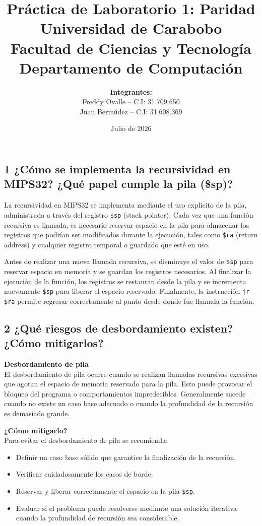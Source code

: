 \documentclass[12pt,a4paper]{article}
\title{
    \textbf{Práctica de Laboratorio 1: Paridad}\\
    \large Universidad de Carabobo \\
    Facultad de Ciencias y Tecnología \\
    Departamento de Computación
}
\author{
    \textbf{Integrantes:}\\
    Freddy Ovalle -- C.I: 31.709.650 \\
    Juan Bermúdez -- C.I: 31.608.369
}
\date{Julio de 2026}
\begin{document}
\maketitle


\subsection*{1 ¿Cómo se implementa la recursividad en MIPS32? ¿Qué papel cumple la pila (\$sp)?}
La recursividad en MIPS32 se implementa mediante el uso explícito de la pila, administrada a través del registro \texttt{\$sp} (stack pointer). Cada vez que una función recursiva es llamada, es necesario reservar espacio en la pila para almacenar los registros que podrían ser modificados durante la ejecución, tales como \texttt{\$ra} (return address) y cualquier registro temporal o guardado que esté en uso. 

Antes de realizar una nueva llamada recursiva, se disminuye el valor de \texttt{\$sp} para reservar espacio en memoria y se guardan los registros necesarios. Al finalizar la ejecución de la función, los registros se restauran desde la pila y se incrementa nuevamente \texttt{\$sp} para liberar el espacio reservado. Finalmente, la instrucción \texttt{jr \$ra} permite regresar correctamente al punto desde donde fue llamada la función.

\subsection*{2 ¿Qué riesgos de desbordamiento existen? ¿Cómo mitigarlos?}
\textbf{Desbordamiento de pila} \\
El desbordamiento de pila ocurre cuando se realizan llamadas recursivas excesivas que agotan el espacio de memoria reservado para la pila. Esto puede provocar el bloqueo del programa o comportamientos impredecibles. Generalmente sucede cuando no existe un caso base adecuado o cuando la profundidad de la recursión es demasiado grande.

\textbf{¿Cómo mitigarlo?} \\
Para evitar el desbordamiento de pila se recomienda:
\begin{itemize}
    \item Definir un caso base sólido que garantice la finalización de la recursión.
    \item Verificar cuidadosamente los casos de borde.
    \item Reservar y liberar correctamente el espacio en la pila \texttt{\$sp}.
    \item Evaluar si el problema puede resolverse mediante una solución iterativa cuando la profundidad de recursión sea considerable.
\end{itemize}
\end{document}
